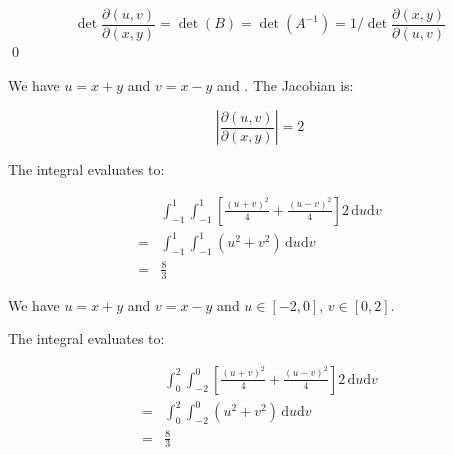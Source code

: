 \documentclass[12pt]{article}
\begin{document}
\begin{equation}
    \det \frac{\partial (u, v)}{\partial (x, y)} = \det(B) = \det(A^{-1}) = 1/ \det \frac{\partial (x, y)}{\partial (u, v)}
\end{equation}
\qed



We have $u = x + y$ and $v = x - y$ and . The Jacobian is:

\begin{equation}
    \left\lvert \frac{\partial (u, v)}{\partial (x, y)} \right\rvert = 2
\end{equation}

The integral evaluates to:

\begin{equation}
    \begin{split}
        &\int_{-1}^{1} \int_{-1}^{1} \left[ \frac{(u + v)^{2}}{4} + \frac{(u - v)^{2}}{4} \right] 2 \, \mathrm{d}u \mathrm{d}v \\
        = &\int_{-1}^{1} \int_{-1}^{1} (u^{2} + v^{2}) \, \mathrm{d}u \mathrm{d}v \\
        = &\frac{8}{3}
    \end{split}
\end{equation}

\begin{correction}
    We have $u = x + y$ and $v = x - y$ and $u \in [-2, 0]$, $v \in [0, 2]$.

    The integral evaluates to:

    \begin{equation}
        \begin{split}
            &\int_{0}^{2} \int_{-2}^{0} \left[ \frac{(u + v)^{2}}{4} + \frac{(u - v)^{2}}{4} \right] 2 \, \mathrm{d}u \mathrm{d}v \\
            = &\int_{0}^{2} \int_{-2}^{0} (u^{2} + v^{2}) \, \mathrm{d}u \mathrm{d}v \\
            = &\frac{8}{3}
        \end{split}
    \end{equation}
\end{correction}


\end{document}
